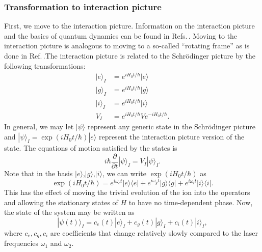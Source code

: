 \subsubsection{Transformation to interaction picture}
First, we move to the interaction picture.
Information on the interaction picture and the basics of quantum dynamics can be found in Refs.\,\cite{sakurai,merzbacher}. Moving to the interaction picture is analogous to moving to a so-called ``rotating frame'' as is done in Ref.\,\cite{Young1997363}.The interaction picture is related to the Schr\"odinger picture by the following transformations: 
\begin{align}
\label{intTransforms}
|e\rangle_I&=e^{iH_0t/\hbar}|e\rangle\\
|g\rangle_I&=e^{iH_0t/\hbar}|g\rangle\\
|i\rangle_I&=e^{iH_0t/\hbar}|i\rangle\\
V_I&=e^{iH_0t/\hbar}Ve^{-iH_0t/\hbar}.
\end{align}
In general, we may let $|\psi\rangle$ represent any generic state in the Schr\"odinger picture and $|\psi\rangle_I=\exp(iH_0t/\hbar)|e\rangle$ represent the interaction picture version of the state. The equations of motion satisfied by the states is 
\begin{equation}
i\hbar \frac{\partial}{\partial t}|\psi\rangle_I= V_I|\psi\rangle_I.
\end{equation}
 Note that in the basis $|e\rangle$,$|g\rangle$,$|i\rangle$, we can write $\exp(iH_0t/\hbar)$ as 
\begin{equation}
\label{expH0}
\exp(iH_0t/\hbar)=e^{i\omega_e t}|e\rangle\langle e|+e^{i\omega_g t}|g\rangle \langle g|+e^{i\omega_i t}|i\rangle\langle i|.
\end{equation}
This has the effect of moving the trivial evolution of the ion into the operators and allowing the stationary states of $H$ to have no time-dependent phase. Now, the state of the system may be written as  
\begin{equation}
|\psi(t)\rangle_I = c_e(t)|e\rangle_I+c_g(t)|g\rangle_I+c_i(t)|i\rangle_I,
\end{equation}
where $c_e,c_g,c_i$ are coefficients that change relatively slowly compared to the laser frequencies $\omega_1$ and $\omega_2$.

